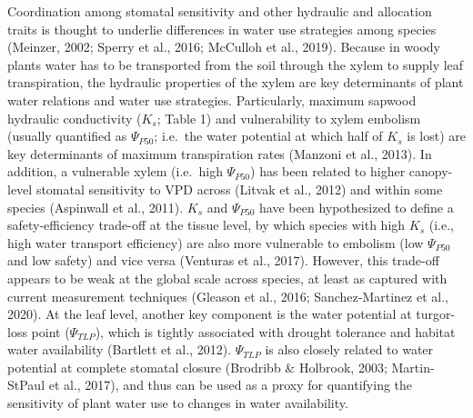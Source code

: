 \documentclass[11pt,twoside]{reedthesis}
\begin{document}
Coordination among stomatal sensitivity and other hydraulic and
allocation traits is thought to underlie differences in water use
strategies among species (Meinzer, 2002; Sperry et al., 2016; McCulloh
et al., 2019). Because in woody plants water has to be transported from
the soil through the xylem to supply leaf transpiration, the hydraulic
properties of the xylem are key determinants of plant water relations
and water use strategies. Particularly, maximum sapwood hydraulic
conductivity (\(K_s\); Table 1) and vulnerability to xylem embolism
(usually quantified as \(\Psi_{P50}\); i.e.~the water potential at which
half of \(K_s\) is lost) are key determinants of maximum transpiration
rates (Manzoni et al., 2013). In addition, a vulnerable xylem (i.e.~high
\textbar{}\(\Psi_{P50}\)\textbar{}) has been related to higher
canopy-level stomatal sensitivity to VPD across (Litvak et al., 2012)
and within some species (Aspinwall et al., 2011). \(K_s\) and
\(\Psi_{P50}\) have been hypothesized to define a safety-efficiency
trade-off at the tissue level, by which species with high \(K_s\) (i.e.,
high water transport efficiency) are also more vulnerable to embolism
(low \textbar{}\(\Psi_{P50}\)\textbar{} and low safety) and vice versa
(Venturas et al., 2017). However, this trade-off appears to be weak at
the global scale across species, at least as captured with current
measurement techniques (Gleason et al., 2016; Sanchez‐Martinez et al.,
2020). At the leaf level, another key component is the water potential
at turgor-loss point (\(\Psi_{TLP}\)), which is tightly associated with
drought tolerance and habitat water availability (Bartlett et al.,
2012). \(\Psi_{TLP}\) is also closely related to water potential at
complete stomatal closure (Brodribb \& Holbrook, 2003; Martin-StPaul et
al., 2017), and thus can be used as a proxy for quantifying the
sensitivity of plant water use to changes in water availability.\par
\end{document}
